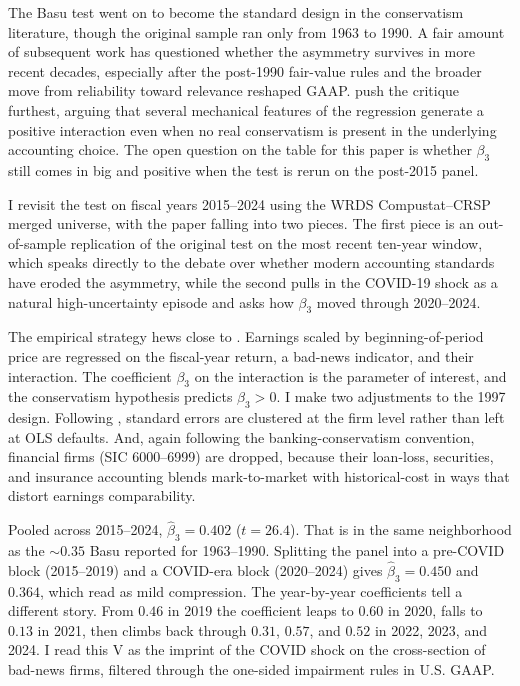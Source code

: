 \documentclass[12pt]{article}
\begin{document}
The Basu test went on to become the standard design in the conservatism literature, though the original sample ran only from 1963 to 1990. A fair amount of subsequent work has questioned whether the asymmetry survives in more recent decades, especially after the post-1990 fair-value rules and the broader move from reliability toward relevance reshaped GAAP. \citet{dietrich2007} push the critique furthest, arguing that several mechanical features of the regression generate a positive interaction even when no real conservatism is present in the underlying accounting choice. The open question on the table for this paper is whether $\beta_3$ still comes in big and positive when the test is rerun on the post-2015 panel.

I revisit the test on fiscal years 2015--2024 using the WRDS Compustat--CRSP merged universe, with the paper falling into two pieces. The first piece is an out-of-sample replication of the original test on the most recent ten-year window, which speaks directly to the debate over whether modern accounting standards have eroded the asymmetry, while the second pulls in the COVID-19 shock as a natural high-uncertainty episode and asks how $\beta_3$ moved through 2020--2024.

The empirical strategy hews close to \citet{basu1997}. Earnings scaled by beginning-of-period price are regressed on the fiscal-year return, a bad-news indicator, and their interaction. The coefficient $\beta_3$ on the interaction is the parameter of interest, and the conservatism hypothesis predicts $\beta_3>0$. I make two adjustments to the 1997 design. Following \citet{petersen2009}, standard errors are clustered at the firm level rather than left at OLS defaults. And, again following the banking-conservatism convention, financial firms (SIC 6000--6999) are dropped, because their loan-loss, securities, and insurance accounting blends mark-to-market with historical-cost in ways that distort earnings comparability.

Pooled across 2015--2024, $\hat{\beta}_3 = 0.402$ ($t=26.4$). That is in the same neighborhood as the $\sim 0.35$ Basu reported for 1963--1990. Splitting the panel into a pre-COVID block (2015--2019) and a COVID-era block (2020--2024) gives $\hat{\beta}_3 = 0.450$ and $0.364$, which read as mild compression. The year-by-year coefficients tell a different story. From $0.46$ in 2019 the coefficient leaps to $0.60$ in 2020, falls to $0.13$ in 2021, then climbs back through $0.31$, $0.57$, and $0.52$ in 2022, 2023, and 2024. I read this V as the imprint of the COVID shock on the cross-section of bad-news firms, filtered through the one-sided impairment rules in U.S. GAAP.
\end{document}
